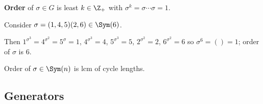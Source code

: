 \begin{slide}
    \begin{definition}[order]
        \vspace{0pt}
        \textbf{Order} of $\sigma \in G$ is least $k \in \Z_+$ with $\sigma^k = \sigma \dotsb \sigma = 1$.
    \end{definition} \pause

    \begin{example}
        \vspace{0pt}
        Consider $\sigma = (1,4,5)(2,6) \in \Sym(6)$.
        \begin{center}
        \end{center} \pause
        Then $1^{\sigma^3} = 4^{\sigma^2} = 5^\sigma = 1$, \pause $4^{\sigma^3} = 4$, $5^{\sigma^3} = 5$, $2^{\sigma^2} = 2$, $6^{\sigma^2} = 6$ so \pause $\sigma^6 = () = 1$; order of $\sigma$ is 6. \pause
    \end{example}

    \begin{proposition}
        Order of $\sigma \in \Sym(n)$ is lcm of cycle lengths.
    \end{proposition}
\end{slide}

\subsection{Generators}

